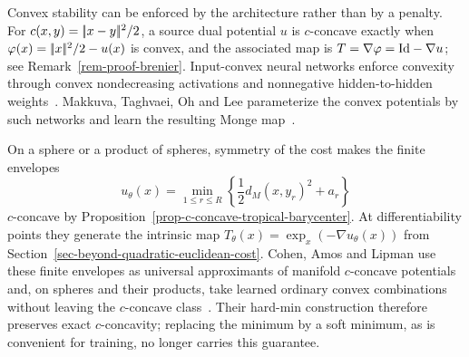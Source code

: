 \begin{example}\label{ex-c-concave-neural-transport}
	Convex stability can be enforced by the architecture rather than by a penalty. For $c(x,y)=|\!| x-y |\!|^2/2$, a source dual potential $u$ is $c$-concave exactly when
	$\varphi(x)=|\!| x |\!|^2/2-u(x)$ is convex, and the associated map is
	$T=\nabla\varphi=\mathrm{Id}-\nabla u$; see Remark~\ref{rem-proof-brenier}. Input-convex neural networks enforce convexity through convex nondecreasing activations and nonnegative hidden-to-hidden weights~\cite{amos2017input}. Makkuva, Taghvaei, Oh and Lee parameterize the convex potentials by such networks and learn the resulting Monge map~\cite{makkuva2020optimal}.

	On a sphere or a product of spheres, symmetry of the cost makes the finite envelopes
	\[
		u_\theta(x)=\min_{1\leq r\leq R}\left\{\frac12d_M(x,y_r)^2+a_r\right\}
	\]
	$c$-concave by Proposition~\ref{prop-c-concave-tropical-barycenter}. At differentiability points they generate the intrinsic map
	$T_\theta(x)=\exp_x(-\nabla u_\theta(x))$ from Section~\ref{sec-beyond-quadratic-euclidean-cost}. Cohen, Amos and Lipman use these finite envelopes as universal approximants of manifold $c$-concave potentials and, on spheres and their products, take learned ordinary convex combinations without leaving the $c$-concave class~\cite{CohenAmosLipman2021}. Their hard-min construction therefore preserves exact $c$-concavity; replacing the minimum by a soft minimum, as is convenient for training, no longer carries this guarantee.
\end{example}
